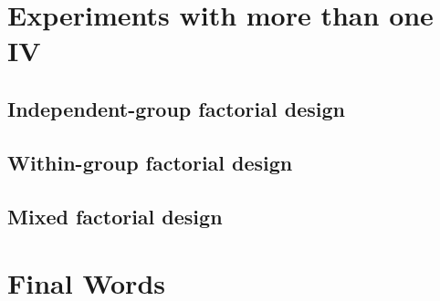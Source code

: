 \documentclass[
]{book}
\begin{document}
\hypertarget{experiments-with-more-than-one-iv}{%
\chapter{Experiments with more than one IV}\label{experiments-with-more-than-one-iv}}

\hypertarget{independent-group-factorial-design}{%
\section{Independent-group factorial design}\label{independent-group-factorial-design}}

\hypertarget{within-group-factorial-design}{%
\section{Within-group factorial design}\label{within-group-factorial-design}}

\hypertarget{mixed-factorial-design}{%
\section{Mixed factorial design}\label{mixed-factorial-design}}

\hypertarget{final-words}{%
\chapter{Final Words}\label{final-words}}

  
\end{document}
